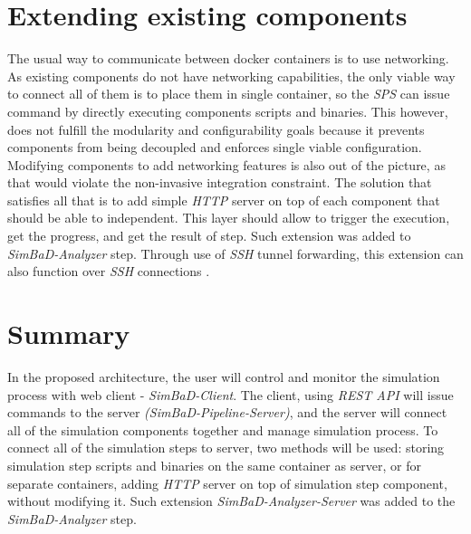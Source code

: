 \section{Extending existing components}
The usual way to communicate between docker containers is to use networking. As existing components do not have networking capabilities, the only viable way to connect all of them is to place them in single container, so the \textit{SPS} can issue command by directly executing components scripts and binaries. This however, does not fulfill the modularity and configurability goals because it prevents components from being decoupled and enforces single viable configuration. Modifying components to add networking features is also out of the picture, as that would violate the non-invasive integration constraint. The solution that satisfies all that is to add simple \textit{HTTP} server on top of each component that should be able to independent. This layer should allow to trigger the execution, get the progress, and get the result of step. Such extension was added to \textit{SimBaD-Analyzer} step. Through use of \textit{SSH} tunnel forwarding, this extension can also function over \textit{SSH} connections \cite{SSHTunnel}.
\section{Summary}
In the proposed architecture, the user will control and monitor the simulation process with web client - \textit{SimBaD-Client}. The client, using \textit{REST API} will issue commands to the server \textit{(SimBaD-Pipeline-Server)}, and the server will connect all of the simulation components together and manage simulation process. To connect all of the simulation steps to server, two methods will be used: storing simulation step scripts and binaries on the same container as server, or for separate containers, adding \textit{HTTP} server on top of simulation step component, without modifying it. Such extension \textit{SimBaD-Analyzer-Server} was added to the \textit{SimBaD-Analyzer} step.